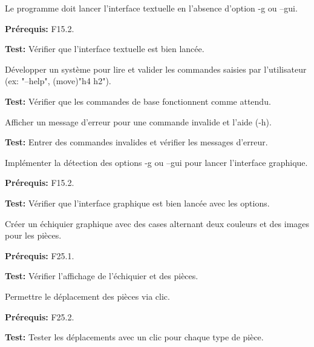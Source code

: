 \documentclass{article}
\begin{document}
\begin{needbox}
    \begin{subneedbox}
        Le programme doit lancer l'interface textuelle en l'absence d'option -g ou --gui.

        \textbf{Prérequis:} F15.2.

        \textbf{Test:} Vérifier que l'interface textuelle est bien lancée.
    \end{subneedbox}
    
    \begin{subneedbox}
        Développer un système pour lire et valider les commandes saisies par l'utilisateur (ex: "--help", (move)"h4 h2").

        \textbf{Test:} Vérifier que les commandes de base fonctionnent comme attendu.
    \end{subneedbox}
    
    \begin{subneedbox}
        Afficher un message d'erreur pour une commande invalide et l’aide (-h).

        \textbf{Test:} Entrer des commandes invalides et vérifier les messages d'erreur.
    \end{subneedbox}
\end{needbox}

\begin{needbox}
    \begin{subneedbox}
        Implémenter la détection des options -g ou --gui pour lancer l'interface graphique.

        \textbf{Prérequis:} F15.2.

        \textbf{Test:} Vérifier que l'interface graphique est bien lancée avec les options.
    \end{subneedbox}
    
    \begin{subneedbox}
        Créer un échiquier graphique avec des cases alternant deux couleurs et des images pour les pièces.

        \textbf{Prérequis:} F25.1.

        \textbf{Test:} Vérifier l'affichage de l'échiquier et des pièces.
    \end{subneedbox}
    
    \begin{subneedbox}
        Permettre le déplacement des pièces via clic.

        \textbf{Prérequis:} F25.2.

        \textbf{Test:} Tester les déplacements avec un clic pour chaque type de pièce.
    \end{subneedbox}
\end{needbox}
\end{document}
